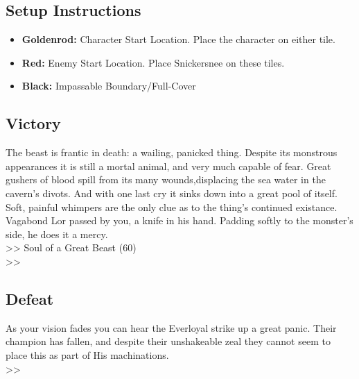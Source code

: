 \subsection*{Setup Instructions}
\begin{itemize}
\item \textbf{Goldenrod:} Character Start Location. Place the character on either tile.
\item \textbf{Red:} Enemy Start Location. Place Snickersnee on these tiles.
\item \textbf{Black:} Impassable Boundary/Full-Cover
\end{itemize}

\pagebreak

\subsection*{Victory}
The beast is frantic in death: a wailing, panicked thing. Despite its monstrous appearances it is still a mortal animal, and very much capable of fear. Great gushers of blood spill from its many wounds,displacing the sea water in the cavern's divots. And with one last cry it sinks down into a great pool of itself.\\

Soft, painful whimpers are the only clue as to the thing's continued existance. Vagabond Lor passed by you, a knife in his hand. Padding softly to the monster's side, he does it a mercy.\\

>> Soul of a Great Beast (60)\\
>> 

\subsection*{Defeat}
As your vision fades you can hear the Everloyal strike up a great panic. Their champion has fallen, and despite their unshakeable zeal they cannot seem to place this as part of His machinations.\\
>> 